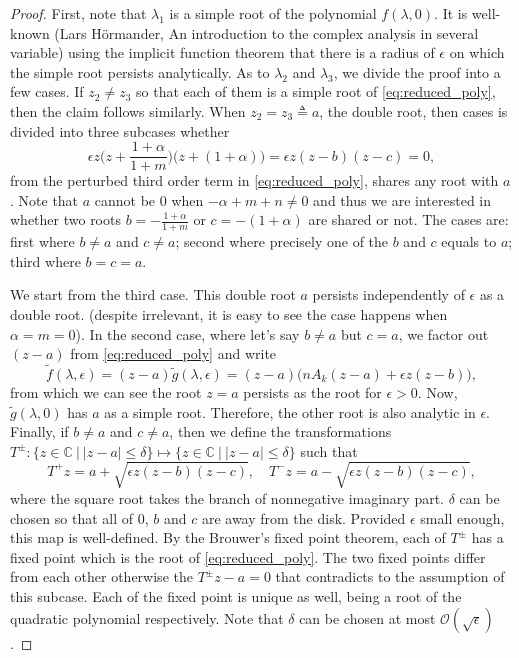 \documentclass[a4paper,11pt]{article}
\theoremstyle{remark}
\begin{document}
\begin{proof}
 First, note that $\lambda_1$ is a simple root of the polynomial $f(\lambda,0)$. It is well-known (Lars H\"ormander, An introduction to the complex analysis in several variable)  using the implicit function theorem that there is a radius of $\epsilon$ on which the simple root persists analytically. As to $\lambda_2$ and $\lambda_3$, we divide the proof into a few cases. If $z_2\ne z_3$ so that each of them is a simple root of \eqref{eq:reduced_poly}, then the claim follows similarly. %
 When $z_2=z_3\triangleq a$, the double root, then cases is divided into three subcases whether 
 $$\epsilon z\Big(z+\frac{1+\alpha}{1+m}\Big)\Big(z+(1+\alpha)\Big)=\epsilon z(z-b)(z-c)=0,$$
 from the perturbed third order term in \eqref{eq:reduced_poly}, shares any root with $a$. Note that $a$ cannot be $0$ when $-\alpha+m+n\ne0$ and thus we are interested in whether two roots $\displaystyle b=-\frac{1+\alpha}{1+m}$ or $c=-(1+\alpha)$ are shared or not. The cases are: first where $b\ne a$ and $c\ne a$; second where precisely one of the $b$ and $c$ equals to $a$; third where $b=c=a$.
 
 We start from the third case. This double root $a$ persists independently of $\epsilon$ as a double root. (despite irrelevant, it is easy to see the case happens when $\alpha=m=0$). In the second case, where let's say $b\ne a$ but $c=a$, we factor out $(z-a)$ from \eqref{eq:reduced_poly} and write
 $$ \tilde{f}(\lambda,\epsilon) = (z-a)\tilde{g}(\lambda,\epsilon) = (z-a)\big(nA_k(z-a) + \epsilon z(z-b)\big),$$
from which we can see the root $z=a$ persists as the root for $\epsilon>0$. Now, $\tilde{g}(\lambda,0)$ has $a$ as a simple root. Therefore, the other root is also analytic in $\epsilon$. Finally, if $b\ne a$ and $c\ne a$, then we define the transformations $T^\pm: \{ z\in \mathbb{C}~|~ |z-a| \le \delta\} \mapsto \{ z\in \mathbb{C}~|~ |z-a| \le \delta\}$ such that 
 $$T^+z = a + \sqrt{\epsilon z(z-b)(z-c)}, \quad T^-z = a - \sqrt{\epsilon z(z-b)(z-c)},$$
 where the square root takes the branch of nonnegative imaginary part. $\delta$ can be chosen so that all of $0$, $b$ and $c$ are away from the disk. Provided $\epsilon$ small enough, this map is well-defined. By the Brouwer's fixed point theorem, each of $T^\pm$ has a fixed point which is the root of \eqref{eq:reduced_poly}. The two fixed points differ from each other otherwise the $T^\pm z -a = 0$ that contradicts to the assumption of this subcase. Each of the fixed point is unique as well, being a root of the quadratic polynomial respectively. Note that $\delta$ can be chosen at most $\mathcal{O}(\sqrt{\epsilon})$.
\end{proof}
\end{document}
